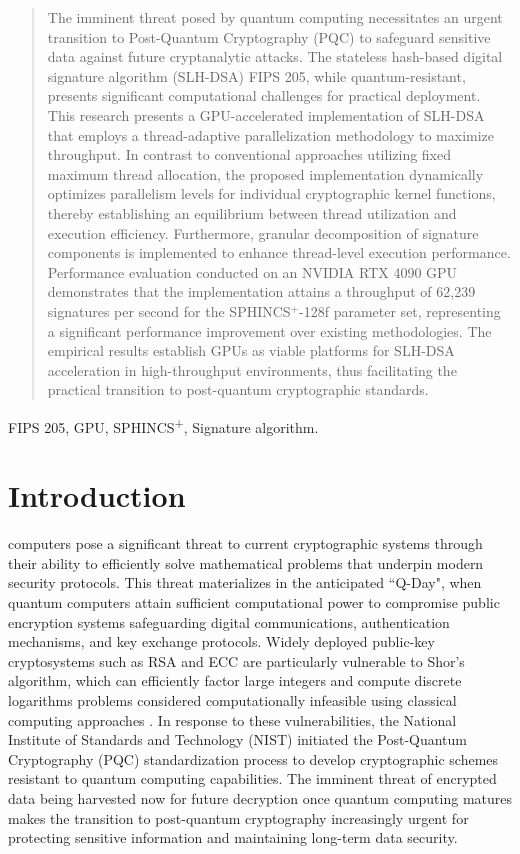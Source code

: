 \documentclass[journal]{IEEEtran}
\begin{document}
\begin{abstract}
  The imminent threat posed by quantum computing necessitates an urgent transition to Post-Quantum Cryptography (PQC) to safeguard sensitive data against future cryptanalytic attacks.
  The stateless hash-based digital signature algorithm (SLH-DSA) FIPS 205, while quantum-resistant, presents significant computational challenges for practical deployment.
  This research presents a GPU-accelerated implementation of SLH-DSA that employs a thread-adaptive parallelization methodology to maximize throughput.
  In contrast to conventional approaches utilizing fixed maximum thread allocation, the proposed implementation dynamically optimizes parallelism levels for individual cryptographic kernel functions, thereby establishing an equilibrium between thread utilization and execution efficiency.
  Furthermore, granular decomposition of signature components is implemented to enhance thread-level execution performance.
  Performance evaluation conducted on an NVIDIA RTX 4090 GPU demonstrates that the implementation attains a throughput of 62,239 signatures per second for the SPHINCS$^+$-128f parameter set, representing a significant performance improvement over existing methodologies.
  The empirical results establish GPUs as viable platforms for SLH-DSA acceleration in high-throughput environments, thus facilitating the practical transition to post-quantum cryptographic standards.

\end{abstract}

\begin{IEEEkeywords}
  FIPS 205, GPU, SPHINCS\textsuperscript{+}, Signature algorithm.
\end{IEEEkeywords}

\section{Introduction}
\label{sec:intro}

 computers pose a significant threat to current cryptographic systems through their ability to efficiently solve mathematical problems that underpin modern security protocols. This threat materializes in the anticipated ``Q-Day", when quantum computers attain sufficient computational power to compromise public encryption systems safeguarding digital communications, authentication mechanisms, and key exchange protocols. Widely deployed public-key cryptosystems such as RSA and ECC are particularly vulnerable to Shor's algorithm, which can efficiently factor large integers and compute discrete logarithms problems considered computationally infeasible using classical computing approaches \cite{Yang2023}.
In response to these vulnerabilities, the National Institute of Standards and Technology (NIST) initiated the Post-Quantum Cryptography (PQC) standardization process to develop cryptographic schemes resistant to quantum computing capabilities. The imminent threat of encrypted data being harvested now for future decryption once quantum computing matures makes the transition to post-quantum cryptography increasingly urgent for protecting sensitive information and maintaining long-term data security.
\end{document}
